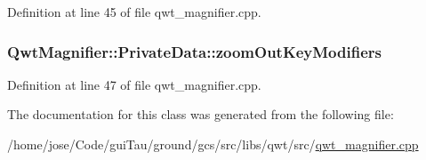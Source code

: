 Definition at line 45 of file qwt\-\_\-magnifier.\-cpp.

\hypertarget{class_qwt_magnifier_1_1_private_data_a1dc7d5f659636d6fc0a746159c6b7246}{
\subsubsection[{zoom\-Out\-Key\-Modifiers}]{ Qwt\-Magnifier\-::\-Private\-Data\-::zoom\-Out\-Key\-Modifiers}}\label{class_qwt_magnifier_1_1_private_data_a1dc7d5f659636d6fc0a746159c6b7246}


Definition at line 47 of file qwt\-\_\-magnifier.\-cpp.



The documentation for this class was generated from the following file\-:\begin{DoxyCompactItemize}
\item 
/home/jose/\-Code/gui\-Tau/ground/gcs/src/libs/qwt/src/\hyperlink{qwt__magnifier_8cpp}{qwt\-\_\-magnifier.\-cpp}\end{DoxyCompactItemize}
